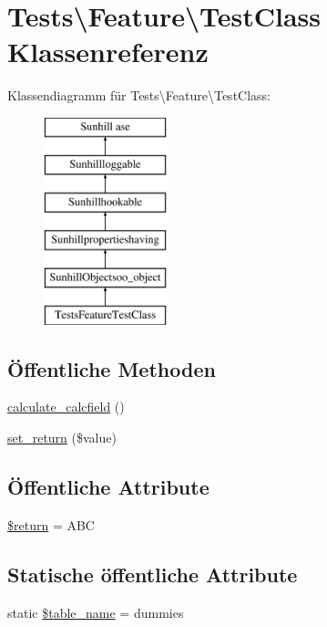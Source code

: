 \hypertarget{classTests_1_1Feature_1_1TestClass}{}\section{Tests\textbackslash{}Feature\textbackslash{}Test\+Class Klassenreferenz}
\label{classTests_1_1Feature_1_1TestClass}
Klassendiagramm für Tests\textbackslash{}Feature\textbackslash{}Test\+Class\+:\begin{figure}[H]
\begin{center}
\leavevmode
\includegraphics[height=6.000000cm]{dd/db2/classTests_1_1Feature_1_1TestClass}
\end{center}
\end{figure}
\subsection*{Öffentliche Methoden}
\begin{DoxyCompactItemize}
\item 
\hyperlink{classTests_1_1Feature_1_1TestClass_a10b491ad8c6dab798f94c1cdfc2fd0c0}{calculate\+\_\+calcfield} ()
\item 
\hyperlink{classTests_1_1Feature_1_1TestClass_a7026939606d37e762ecf5670b60ed620}{set\+\_\+return} (\$value)
\end{DoxyCompactItemize}
\subsection*{Öffentliche Attribute}
\begin{DoxyCompactItemize}
\item 
\hyperlink{classTests_1_1Feature_1_1TestClass_aa8a1e742297c3e5f8d9c18d3d12444f4}{\$return} = \textquotesingle{}A\+BC\textquotesingle{}
\end{DoxyCompactItemize}
\subsection*{Statische öffentliche Attribute}
\begin{DoxyCompactItemize}
\item 
static \hyperlink{classTests_1_1Feature_1_1TestClass_aeaf0eba31c750ed3795f94737747e2b0}{\$table\+\_\+name} = \textquotesingle{}dummies\textquotesingle{}
\end{DoxyCompactItemize}
